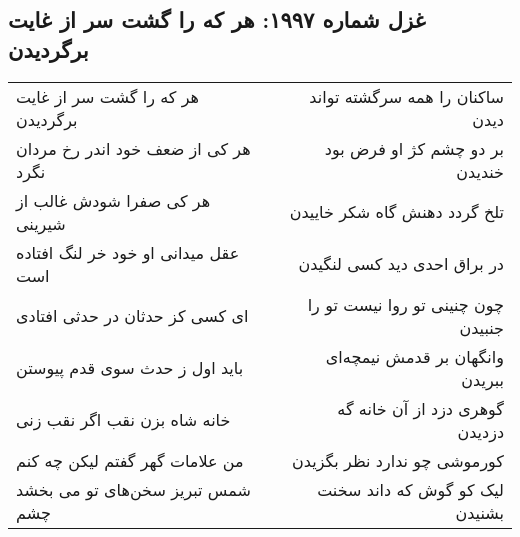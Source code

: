 \begin{center}
\section*{غزل شماره ۱۹۹۷: هر که را گشت سر از غایت برگردیدن}
\label{sec:1997}
\begin{longtable}{l p{0.5cm} r}
هر که را گشت سر از غایت برگردیدن
&&
ساکنان را همه سرگشته تواند دیدن
\\
هر کی از ضعف خود اندر رخ مردان نگرد
&&
بر دو چشم کژ او فرض بود خندیدن
\\
هر کی صفرا شودش غالب از شیرینی
&&
تلخ گردد دهنش گاه شکر خاییدن
\\
عقل میدانی او خود خر لنگ افتاده است
&&
در براق احدی دید کسی لنگیدن
\\
ای کسی کز حدثان در حدثی افتادی
&&
چون چنینی تو روا نیست تو را جنبیدن
\\
باید اول ز حدث سوی قدم پیوستن
&&
وانگهان بر قدمش نیمچه‌ای ببریدن
\\
خانه شاه بزن نقب اگر نقب زنی
&&
گوهری دزد از آن خانه گه دزدیدن
\\
من علامات گهر گفتم لیکن چه کنم
&&
کورموشی چو ندارد نظر بگزیدن
\\
شمس تبریز سخن‌های تو می بخشد چشم
&&
لیک کو گوش که داند سخنت بشنیدن
\\
\end{longtable}
\end{center}
